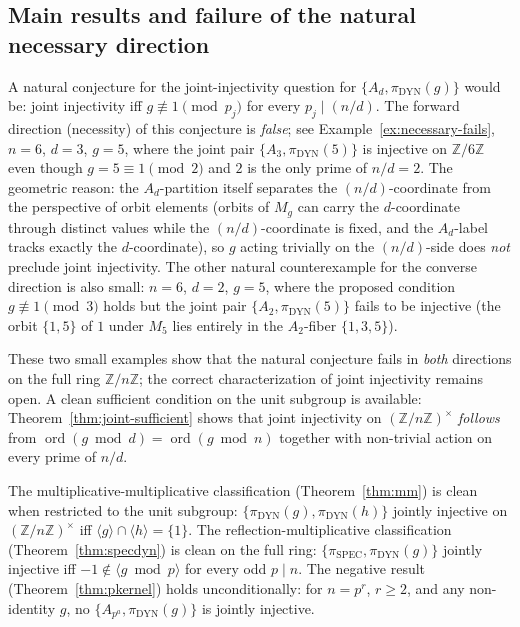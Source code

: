 \documentclass[11pt,reqno]{amsart}
\theoremstyle{plain}
\theoremstyle{definition}
\theoremstyle{remark}
\DeclareMathOperator{\ord}{ord}
\DeclareMathOperator{\spec}{SPEC}
\DeclareMathOperator{\dyn}{DYN}
\newcommand{\Z}{\mathbb{Z}}
\begin{document}
\subsection{Main results and failure of the natural necessary direction}

A natural conjecture for the joint-injectivity question for $\{A_{d},
\pi_{\dyn}(g)\}$ would be: joint injectivity iff $g \not\equiv 1
\pmod{p_{j}}$ for every $p_{j} \mid (n/d)$. The forward direction
(necessity) of this conjecture is \emph{false}; see
Example~\ref{ex:necessary-fails}, $n = 6$, $d = 3$, $g = 5$, where
the joint pair $\{A_{3}, \pi_{\dyn}(5)\}$ is injective on $\Z/6\Z$
even though $g = 5 \equiv 1 \pmod 2$ and $2$ is the only prime of
$n/d = 2$. The geometric reason: the $A_{d}$-partition itself
separates the $(n/d)$-coordinate from the perspective of orbit
elements (orbits of $M_{g}$ can carry the $d$-coordinate through
distinct values while the $(n/d)$-coordinate is fixed, and the
$A_{d}$-label tracks exactly the $d$-coordinate), so $g$ acting
trivially on the $(n/d)$-side does \emph{not} preclude joint
injectivity. The other natural counterexample for the converse
direction is also small: $n = 6$, $d = 2$, $g = 5$, where the
proposed condition $g \not\equiv 1 \pmod{3}$ holds but the joint
pair $\{A_{2}, \pi_{\dyn}(5)\}$ fails to be injective (the orbit
$\{1, 5\}$ of $1$ under $M_{5}$ lies entirely in the $A_{2}$-fiber
$\{1, 3, 5\}$).

These two small examples show that the natural conjecture fails in
\emph{both} directions on the full ring $\Z/n\Z$; the correct
characterization of joint injectivity remains open. A clean
sufficient condition on the unit subgroup is available:
Theorem~\ref{thm:joint-sufficient} shows that joint injectivity on
$(\Z/n\Z)^{\times}$ \emph{follows} from $\ord(g \bmod d) = \ord(g
\bmod n)$ together with non-trivial action on every prime of $n/d$.

The multiplicative-multiplicative classification
(Theorem~\ref{thm:mm}) is clean when restricted to the unit subgroup:
$\{\pi_{\dyn}(g), \pi_{\dyn}(h)\}$ jointly injective on $(\Z/n\Z)^{\times}$
iff $\langle g \rangle \cap \langle h \rangle = \{1\}$. The
reflection-multiplicative classification (Theorem~\ref{thm:specdyn})
is clean on the full ring: $\{\pi_{\spec}, \pi_{\dyn}(g)\}$ jointly
injective iff $-1 \notin \langle g \bmod p \rangle$ for every odd
$p \mid n$. The negative result (Theorem~\ref{thm:pkernel}) holds
unconditionally: for $n = p^{r}$, $r \ge 2$, and any non-identity
$g$, no $\{A_{p^{a}}, \pi_{\dyn}(g)\}$ is jointly injective.
\end{document}
